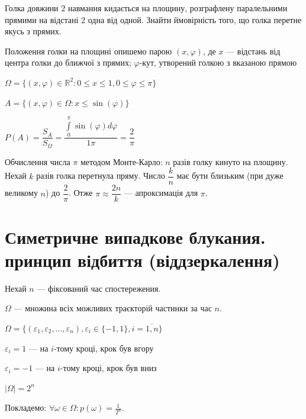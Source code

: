 \begin{example}
    Голка довжини $2$ навмання кидається на
    площину, розграфлену паралельними прямими на відстані
    $2$ одна від одной. Знайти ймовірність того, що голка
    перетне якусь з прямих.
\end{example}

\begin{solution}
    \beautifulImage
    
    Положення голки на площині опишемо парою $(x, \varphi)$, де
    $x$ --- відстань від центра голки до ближчої з прямих;
    $\varphi$-кут, утворений голкою з вказаною прямою

    \beautifulImage
    \beautifulImage

    $\Omega = \{(x, \varphi) \in \mathbb{R}^2: 0 \leqslant x \leqslant 1,
        0 \leqslant \varphi \leqslant \pi \}$

    $A = \{(x, \varphi) \in \Omega: x \leqslant \sin(\varphi)\}$

    $P(A) = \dfrac{S_A}{S_{\Omega}}
    = \dfrac{\int\limits_0^{\pi} \sin(\varphi) d \varphi}{1\pi}
    = \dfrac{2}{\pi}$

    \beautifulImage
    
    Обчислення числа $\pi$ методом Монте-Карло: $n$ разів голку
    кинуто на площину. Нехай $k$ разів голка перетнула пряму.
    Число $\dfrac{k}{n}$ має бути близьким (при дуже великому $n$)
    до $\dfrac{2}{\pi}$. Отже $\pi \approx \dfrac{2n}{k}$
    --- апроксимація для $\pi$.
\end{solution}

\section{Симетричне випадкове блукания. принцип відбиття (віддзеркалення)}

\beautifulImage

Нехай $n$ --- фіксований час спостережения.

$\Omega$ --- множина всіх можливих траєкторій
частинки за час $n$.

$\Omega = \{(\varepsilon_1, \varepsilon_2, ..., \varepsilon_n),
    \varepsilon_i \in \{-1, 1\},
    i = \overline{1, n}\}$

$\varepsilon_i = 1$ --- на  $i$-тому кроці, крок був вгору

$\varepsilon_i = -1$ --- на  $i$-тому кроці, крок був вниз

$|\Omega| = 2^n$

Покладемо: $\forall \omega \in \Omega: p(\omega) = \frac{1}{2^n}$.


